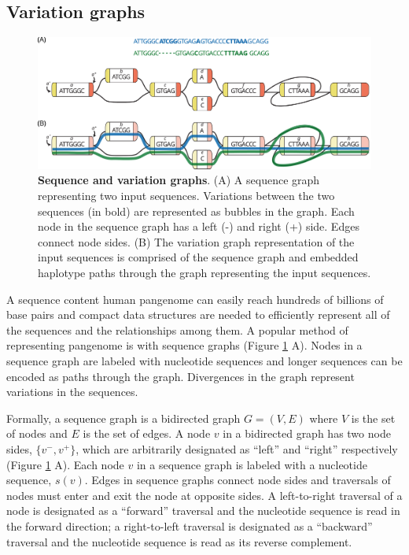 \documentclass[11pt]{ucscthesis}
\begin{document}
\subsection{Variation graphs}
\begin{figure}
    \centering
    \includegraphics[width=\columnwidth]{example_graph.pdf}
    \caption[Sequence graph]{\textbf{Sequence and variation graphs}. (A) A sequence graph representing two input sequences. Variations between the two sequences (in bold) are represented as bubbles in the graph. Each node in the sequence graph has a left (-) and right (+) side. Edges connect node sides. (B) The variation graph representation of the input sequences is comprised of the sequence graph and embedded haplotype paths through the graph representing the input sequences.}
    \label{fig:example_graph}
\end{figure}

A sequence content human pangenome can easily reach hundreds of billions of base pairs and compact data structures are needed to efficiently represent all of the sequences and the relationships among them. 
A popular method of representing pangenome is with sequence graphs (Figure \ref{fig:example_graph} A).
Nodes in a sequence graph are labeled with nucleotide sequences and longer sequences can be encoded as paths through the graph.
Divergences in the graph represent variations in the sequences.

Formally, a sequence graph is a bidirected graph $G = (V, E)$ where $V$ is the set of nodes and $E$ is the set of edges.
A node $v$ in a bidirected graph has two node sides, $\{v^{-}, v^{+}\}$, which are arbitrarily designated as ``left'' and ``right'' respectively (Figure \ref{fig:example_graph} A).
Each node $v$ in a sequence graph is labeled with a nucleotide sequence, $s(v)$.
Edges in sequence graphs connect node sides and traversals of nodes must enter and exit the node at opposite sides.
A left-to-right traversal of a node is designated as a ``forward'' traversal and the nucleotide sequence is read in the forward direction; a right-to-left traversal is designated as a ``backward'' traversal and the nucleotide sequence is read as its reverse complement.
\end{document}

